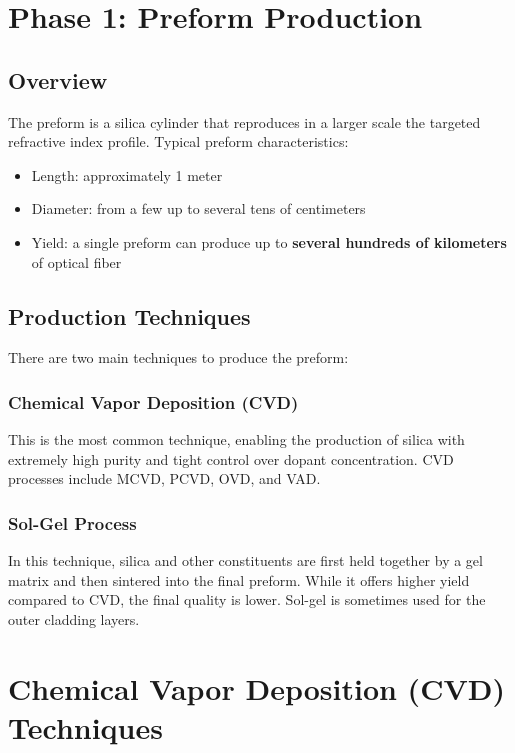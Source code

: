 \documentclass[a4paper, 11pt]{article}
\begin{document}
\section{Phase 1: Preform Production}

\subsection{Overview}

The preform is a silica cylinder that reproduces in a larger scale the targeted refractive index profile. Typical preform characteristics:

\begin{itemize}
    \item Length: approximately 1 meter
    \item Diameter: from a few up to several tens of centimeters
    \item Yield: a single preform can produce up to \textbf{several hundreds of kilometers} of optical fiber
\end{itemize}

\subsection{Production Techniques}

There are two main techniques to produce the preform:

\subsubsection{Chemical Vapor Deposition (CVD)}

This is the most common technique, enabling the production of silica with extremely high purity and tight control over dopant concentration. CVD processes include MCVD, PCVD, OVD, and VAD.

\subsubsection{Sol-Gel Process}

In this technique, silica and other constituents are first held together by a gel matrix and then sintered into the final preform. While it offers higher yield compared to CVD, the final quality is lower. Sol-gel is sometimes used for the outer cladding layers.

\section{Chemical Vapor Deposition (CVD) Techniques}
\end{document}
